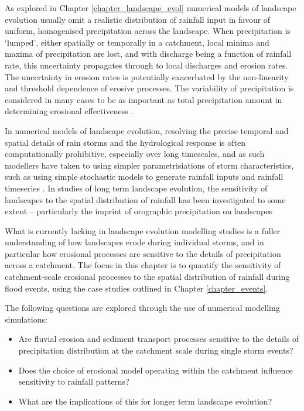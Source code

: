 As explored in Chapter \ref{chapter_landscape_evol} numerical models of landscape evolution usually omit a realistic distribution of rainfall input in favour of uniform, homogenised precipitation across the landscape. When precipitation is `lumped', either spatially or temporally in a catchment, local minima and maxima of precipitation are lost, and with discharge being a function of rainfall rate, this uncertainty propagates through to local discharges and erosion rates. The uncertainty in erosion rates is potentially exacerbated by the non-linearity and threshold dependence of erosive processes. The variability of precipitation is considered in many cases to be as important as total precipitation amount in determining erosional effectiveness \citep{Tucker2000,Tucker2010}.

In numerical models of landscape evolution, resolving the precise temporal and spatial details of rain storms and the hydrological response is often computationally prohibitive, especially over long timescales, and as such modellers have taken to using simpler parametrisiations of storm characteristics, such as using simple stochastic models to generate rainfall inputs and rainfall timeseries \citep{Eagleson1978,Tucker2001}. In studies of long term landscape evolution, the sensitivity of landscapes to the spatial distribution of rainfall has been investigated to some extent -- particularly the imprint of orographic precipitation on landscapes \citep[e.g][]{Roe2002,Anders2008,Han2014}

What is currently lacking in landscape evolution modelling studies is a fuller understanding of how landscapes erode during individual storms, and in particular how erosional processes are sensitive to the details of precipitation across a catchment. The focus in this chapter is to quantify the sensitivity of catchment-scale erosional processes to the spatial distribution of rainfall during flood events, using the case studies outlined in Chapter \ref{chapter_events}.

The following questions are explored through the use of numerical modelling simulations:

\begin{itemize}
\item Are fluvial erosion and sediment transport processes sensitive to the details of precipitation distribution at the catchment scale during single storm events?
\item Does the choice of erosional model operating within the catchment influence sensitivity to rainfall patterns? 
\item What are the implications of this for longer term landscape evolution? 
\end{itemize}


